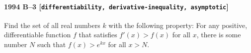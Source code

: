 \paragraph{1994 B--3 \textnormal{[\texttt{differentiability, derivative-inequality, asymptotic}]}}
Find the set of all real numbers $k$ with the following property: For any
positive, differentiable function $f$ that satisfies $f'(x) > f(x)$
for all $x$, there is some number $N$ such that
$f(x) > e^{kx}$ for all $x > N$.
